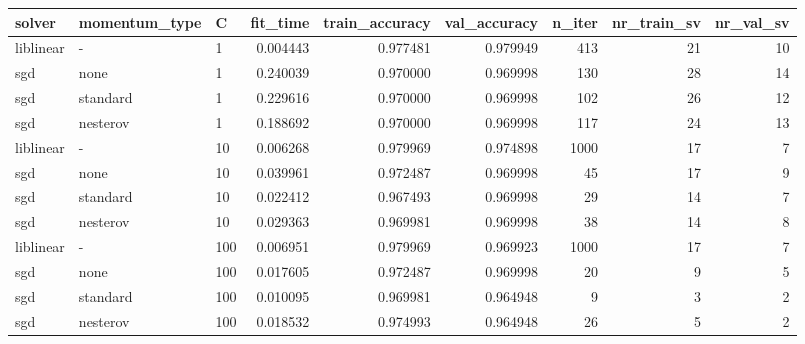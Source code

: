 \begin{tabular}{lllrrrrrr}
\toprule
   solver & momentum\_type &   C &  fit\_time &  train\_accuracy &  val\_accuracy &  n\_iter &  nr\_train\_sv &  nr\_val\_sv \\
\midrule
liblinear &             - &   1 &  0.004443 &        0.977481 &      0.979949 &     413 &           21 &         10 \\
      sgd &          none &   1 &  0.240039 &        0.970000 &      0.969998 &     130 &           28 &         14 \\
      sgd &      standard &   1 &  0.229616 &        0.970000 &      0.969998 &     102 &           26 &         12 \\
      sgd &      nesterov &   1 &  0.188692 &        0.970000 &      0.969998 &     117 &           24 &         13 \\
liblinear &             - &  10 &  0.006268 &        0.979969 &      0.974898 &    1000 &           17 &          7 \\
      sgd &          none &  10 &  0.039961 &        0.972487 &      0.969998 &      45 &           17 &          9 \\
      sgd &      standard &  10 &  0.022412 &        0.967493 &      0.969998 &      29 &           14 &          7 \\
      sgd &      nesterov &  10 &  0.029363 &        0.969981 &      0.969998 &      38 &           14 &          8 \\
liblinear &             - & 100 &  0.006951 &        0.979969 &      0.969923 &    1000 &           17 &          7 \\
      sgd &          none & 100 &  0.017605 &        0.972487 &      0.969998 &      20 &            9 &          5 \\
      sgd &      standard & 100 &  0.010095 &        0.969981 &      0.964948 &       9 &            3 &          2 \\
      sgd &      nesterov & 100 &  0.018532 &        0.974993 &      0.964948 &      26 &            5 &          2 \\
\bottomrule
\end{tabular}
